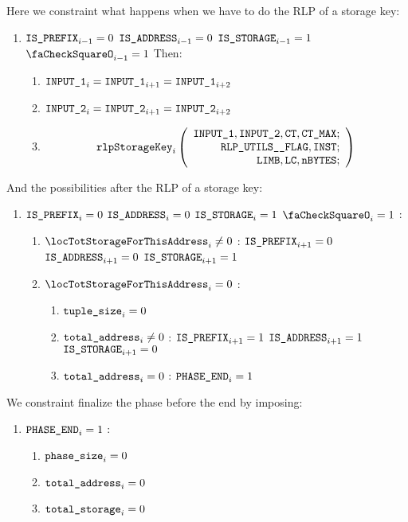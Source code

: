 \begin{enumerate}[resume]
Here we constraint what happens when we have to do the RLP of a storage key: 
\begin{enumerate}[resume]
	\item \If $\texttt{IS\_PREFIX}_{i-1} = 0$ \et $\texttt{IS\_ADDRESS}_{i-1} = 0$ \et $\texttt{IS\_STORAGE}_{i-1} = 1$ \et $\done_{i-1} =1$ Then:
	\begin{enumerate}
		\item $\texttt{INPUT\_1}_{i} = \texttt{INPUT\_1}_{i+1} = \texttt{INPUT\_1}_{i+2}$
		\item $\texttt{INPUT\_2}_{i} = \texttt{INPUT\_2}_{i+1} = \texttt{INPUT\_2}_{i+2}$
		\item \[
    		  \texttt{rlpStorageKey}_{i}
    		  \left(
			  \begin{array}{r}
    		  \texttt{INPUT\_1},
    		  \texttt{INPUT\_2},
    		  \texttt{CT},
    		  \texttt{CT\_MAX}; \\
    		  \texttt{RLP\_UTILS\_\_FLAG},
    		  \texttt{INST}; \\
    		  \texttt{LIMB},
    		  \texttt{LC},
    		  \texttt{nBYTES}; \\
    		  \end{array}
			  \right)
			  \]
	\end{enumerate}
\end{enumerate}
And the possibilities after the RLP of a storage key:
\begin{enumerate}[resume]
	\item \If $\texttt{IS\_PREFIX}_{i} = 0$ \et $\texttt{IS\_ADDRESS}_{i} = 0$ \et $\texttt{IS\_STORAGE}_{i} = 1$ \et $\done_{i} =1$ \Then:
	\begin{enumerate}
		\item \If $\locTotStorageForThisAddress_{i} \neq 0$ \Then: $\texttt{IS\_PREFIX}_{i+1} = 0$ \et $\texttt{IS\_ADDRESS}_{i+1} = 0$ \et $\texttt{IS\_STORAGE}_{i+1} = 1$
		\item \If $\locTotStorageForThisAddress_{i} = 0$ \Then: 
		\begin{enumerate}
			\item $\texttt{tuple\_size}_{i} = 0$
			\item \If $\texttt{total\_address}_{i} \neq 0$ \Then: $\texttt{IS\_PREFIX}_{i+1} = 1$ \et $\texttt{IS\_ADDRESS}_{i+1} = 1$ \et $\texttt{IS\_STORAGE}_{i+1} = 0$
			\item \If $\texttt{total\_address}_{i} = 0$ \Then: $\texttt{PHASE\_END}_{i} =1$
		\end{enumerate}
	\end{enumerate}
\end{enumerate}

We constraint finalize the phase before the end by imposing:
\begin{enumerate}
	\item \If $\texttt{PHASE\_END}_{i} =1$ \Then: 
	\begin{enumerate}
		\item $\texttt{phase\_size}_{i} =0$
		\item $\texttt{total\_address}_{i} =0$
		\item $\texttt{total\_storage}_{i} =0$
	\end{enumerate}
\end{enumerate}


\end{enumerate}
